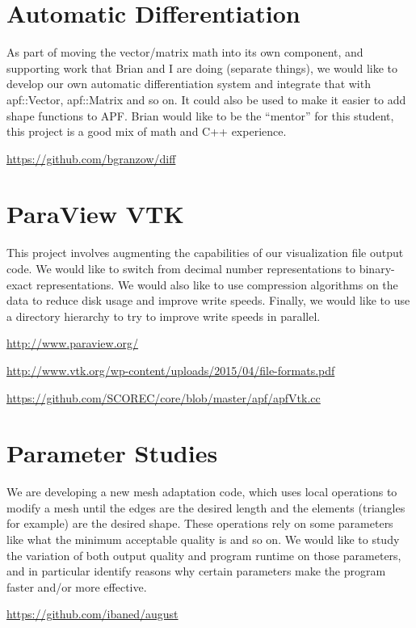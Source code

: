 \documentclass[12pt]{article}
\begin{document}
\maketitle

\section{Automatic Differentiation} 
As part of moving the vector/matrix math into its own component, and supporting
work that Brian and I are doing (separate things), we would like to develop our
own automatic differentiation system and integrate that with apf::Vector,
apf::Matrix and so on. It could also be used to make it easier to add shape
functions to APF. Brian would like to be the “mentor” for this student, this
project is a good mix of math and C++ experience.

\url{https://github.com/bgranzow/diff}

\section{ParaView VTK} 
This project involves augmenting the capabilities of our visualization file
output code. We would like to switch from decimal number representations to
binary-exact representations. We would also like to use compression algorithms
on the data to reduce disk usage and improve write speeds. Finally, we would
like to use a directory hierarchy to try to improve write speeds in parallel.

\url{http://www.paraview.org/}

\url{http://www.vtk.org/wp-content/uploads/2015/04/file-formats.pdf}

\url{https://github.com/SCOREC/core/blob/master/apf/apfVtk.cc}

\section{Parameter Studies}
We are developing a new mesh adaptation code, which uses local operations to
modify a mesh until the edges are the desired length and the elements
(triangles for example) are the desired shape. These operations rely on some
parameters like what the minimum acceptable quality is and so on. We would like
to study the variation of both output quality and program runtime on those
parameters, and in particular identify reasons why certain parameters make the
program faster and/or more effective.

\url{https://github.com/ibaned/august}
\end{document}
